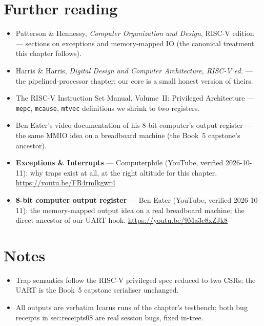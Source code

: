 \section*{Further reading}
\label{sec:fr08}
\begin{itemize}
\item Patterson \& Hennessy, \emph{Computer Organization and
      Design}, RISC-V edition --- sections on exceptions and
      memory-mapped IO (the canonical treatment this chapter follows).
\item Harris \& Harris, \emph{Digital Design and Computer
      Architecture, RISC-V ed.} --- the pipelined-processor chapter;
      our core is a small honest version of theirs.
\item The RISC-V Instruction Set Manual, Volume~II: Privileged
      Architecture --- \texttt{mepc}, \texttt{mcause},
      \texttt{mtvec} definitions we shrink to two registers.
\item Ben Eater's video documentation of his 8-bit computer's output
      register --- the same MMIO idea on a breadboard machine
      (the Book~5 capstone's ancestor).
\end{itemize}

\begin{rulebox}
\begin{itemize}
\item \textbf{Exceptions \& Interrupts} --- Computerphile
      (YouTube, verified 2026-10-11): why traps exist at all, at the
      right altitude for this chapter.
      \url{https://youtu.be/FR4rmlkgwr4}
\item \textbf{8-bit computer output register} --- Ben Eater
      (YouTube, verified 2026-10-11): the memory-mapped output idea
      on a real breadboard machine; the direct ancestor of our UART
      hook. \url{https://youtu.be/9Ma3c8xZJk8}
\end{itemize}
\end{rulebox}

\section*{Notes}
\label{sec:notes08}
\begin{itemize}
\item Trap semantics follow the RISC-V privileged spec reduced to
      two CSRs; the UART is the Book~5 capstone serialiser unchanged.
\item All outputs are verbatim Icarus runs of the chapter's
      testbench; both bug receipts in sec:receipts08 are real
      session bugs, fixed in-tree.
\end{itemize}

